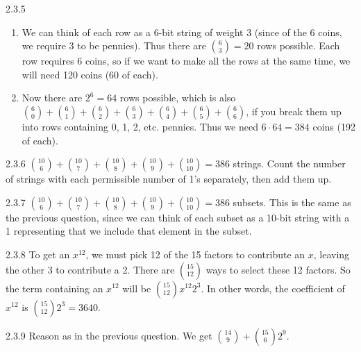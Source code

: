 \documentclass[11pt,]{book}
\theoremstyle{ptxplainnotitle}
\theoremstyle{ptxplaintitle}
\theoremstyle{ptxdefinitionnotitle}
\theoremstyle{ptxdefinitiontitle}
\theoremstyle{ptxdefinitionnotitle}
\theoremstyle{ptxdefinitiontitle}
\theoremstyle{ptxdefinitionnotitle}
\theoremstyle{ptxdefinitiontitle}
\theoremstyle{ptxdefinitiontitlenonumber}
\theoremstyle{ptxdefinitiontitlenonumber}
\numberwithin{equation}{chapter}
\begin{document}
\begin{divisionexercise}{2.3.5}
\textbf{}\hypertarget{p-1364}{}%
\leavevmode%
\begin{enumerate}[label=(\alph*)]
\item\hypertarget{li-599}{}\hypertarget{p-1365}{}%
We can think of each row as a 6-bit string of weight 3 (since of the 6 coins, we require 3 to be pennies).  Thus there are \({6 \choose 3} = 20\) rows possible.  Each row requires 6 coins, so if we want to make all the rows at the same time, we will need 120 coins (60 of each).%
\item\hypertarget{li-600}{}\hypertarget{p-1366}{}%
Now there are \(2^6 = 64\) rows possible, which is also \({6 \choose 0} + {6\choose 1} + {6 \choose 2} + {6 \choose 3} + {6 \choose 4} + {6 \choose 5} + {6 \choose 6}\text{,}\) if you break them up into rows containing 0, 1, 2, etc. pennies.  Thus we need \(6 \cdot 64 = 384\) coins (192 of each).%
\end{enumerate}
%
\end{divisionexercise}%
\begin{divisionexercise}{2.3.6}
\textbf{}\hypertarget{p-1372}{}%
\({10 \choose 6} + {10\choose 7} + {10\choose 8} + {10 \choose 9} + {10\choose 10} = 386\) strings.  Count the number of strings with each permissible number of 1's separately, then add them up.%
\end{divisionexercise}%
\begin{divisionexercise}{2.3.7}
\textbf{}\hypertarget{p-1380}{}%
\({10 \choose 6} + {10\choose 7} + {10\choose 8} + {10 \choose 9} + {10\choose 10} = 386\) subsets. This is the same as the previous question, since we can think of each subset as a 10-bit string with a 1 representing that we include that element in the subset.%
\end{divisionexercise}%
\begin{divisionexercise}{2.3.8}
\textbf{}\hypertarget{p-1386}{}%
To get an \(x^{12}\text{,}\) we must pick 12 of the 15 factors to contribute an \(x\text{,}\) leaving the other 3 to contribute a 2. There are \({15 \choose 12}\) ways to select these 12 factors. So the term containing an \(x^{12}\) will be \({15 \choose 12}x^{12}2^{3}\text{.}\) In other words, the coefficient of \(x^{12}\) is \({15\choose 12}2^3 = 3640\text{.}\)%
\end{divisionexercise}%
\begin{divisionexercise}{2.3.9}
\textbf{}\hypertarget{p-1392}{}%
Reason as in the previous question. We get \({14\choose 9} + {15 \choose 6}2^9\text{.}\)%
\end{divisionexercise}%
\end{document}
